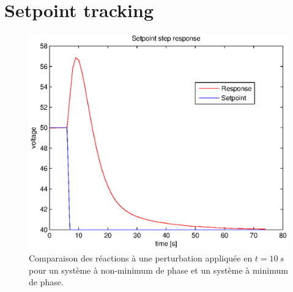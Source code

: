 \documentclass[frenchb, paper=a4, fontsize=11pt]{scrartcl}
\numberwithin{equation}{section}					%
\numberwithin{figure}{section}					%
\numberwithin{table}{section}						%
\begin{document}
\section{Setpoint tracking}
\begin{figure}[ht]
	\centering
	\includegraphics[scale=0.9]{img/setpoint-step-response.eps}
	\caption{Comparaison des réactions à une perturbation appliquée en
	$t=\SI{10}{s}$ pour un système à non-minimum de phase et un système
	à minimum de phase.}
	\label{fig:pert-rej}
\end{figure}
\end{document}
